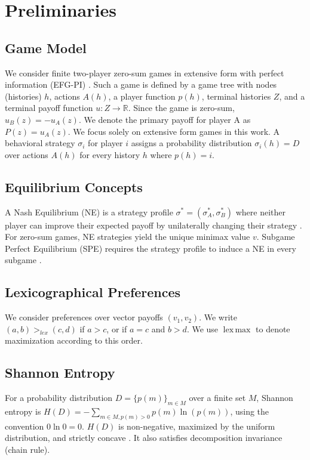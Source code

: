 \documentclass{article}
\DeclareMathOperator*{\lexmax}{lex\,max}
\begin{document}
\section{Preliminaries}

\subsection{Game Model}
We consider finite two-player zero-sum games in extensive form with perfect information (EFG-PI) \cite{placeholder_osborne_rubinstein}. Such a game is defined by a game tree with nodes (histories) $h$, actions $A(h)$, a player function $p(h)$, terminal histories $Z$, and a terminal payoff function $u: Z \to \mathbb{R}$. Since the game is zero-sum, $u_B(z) = -u_A(z)$. We denote the primary payoff for player A as $P(z) = u_A(z)$. We focus solely on extensive form games in this work. A behavioral strategy $\sigma_i$ for player $i$ assigns a probability distribution $\sigma_i(h) = D$ over actions $A(h)$ for every history $h$ where $p(h) = i$.

\subsection{Equilibrium Concepts}
A Nash Equilibrium (NE) is a strategy profile $\sigma^* = (\sigma_A^*, \sigma_B^*)$ where neither player can improve their expected payoff by unilaterally changing their strategy \cite{placeholder_nash}. For zero-sum games, NE strategies yield the unique minimax value $v$. Subgame Perfect Equilibrium (SPE) requires the strategy profile to induce a NE in every subgame \cite{placeholder_selten_spe}.

\subsection{Lexicographical Preferences}
We consider preferences over vector payoffs $(v_1, v_2)$. We write $(a, b) >_{lex} (c, d)$ if $a > c$, or if $a = c$ and $b > d$. We use $\lexmax$ to denote maximization according to this order.

\subsection{Shannon Entropy}
For a probability distribution $D = \{p(m)\}_{m \in M}$ over a finite set $M$, Shannon entropy is $H(D) = - \sum_{m \in M, p(m)>0} p(m) \ln(p(m))$, using the convention $0 \ln 0 = 0$. $H(D)$ is non-negative, maximized by the uniform distribution, and strictly concave \cite{placeholder_cover_thomas}. It also satisfies decomposition invariance (chain rule).
\end{document}
